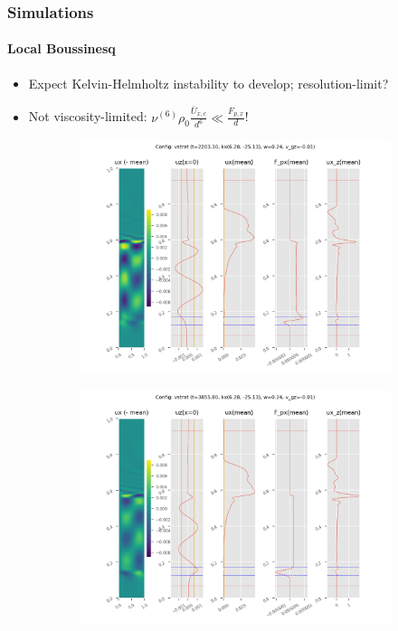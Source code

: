 \documentclass[dvipsnames, 10pt]{beamer}
\begin{document}
\begin{frame}
    \frametitle{Simulations}
    \framesubtitle{Local Boussinesq}
    \begin{itemize}
        \item Expect Kelvin-Helmholtz instability to develop; resolution-limit?

        \item Not viscosity-limited: $\nu^{(6)} \rho_0
            \frac{\bar{U}_{x, c}}{d^6} \ll \frac{F_{p, x}}{d}$!
    \end{itemize}

    \begin{figure}[t]
        \centering
        \hspace*{-19mm}%
        \begin{subfigure}{0.55\textwidth}
            \centering
            \includegraphics[width=\textwidth]{vstrat_2.png}
        \end{subfigure}
        \begin{subfigure}{0.55\textwidth}
            \centering
            \includegraphics[width=\textwidth]{vstrat_3.png}
        \end{subfigure}
        \hspace*{-19mm}%
    \end{figure}
\end{frame}
\end{document}
